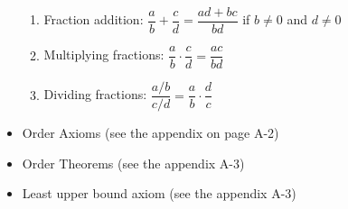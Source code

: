 \documentclass[11pt]{article}
\begin{document}
\begin{itemize}
\begin{enumerate}[label=T\arabic*]
        \item Fraction addition: $\dfrac{a}{b} + \dfrac{c}{d} = \dfrac{ad + bc}{bd}$ if $b\neq 0$ and $d\neq 0$
        \item Multiplying fractions: $\dfrac{a}{b} \cdot \dfrac{c}{d} = \dfrac{ac}{bd}$ 
        \item Dividing fractions: $\dfrac{a/b}{c/d} = \dfrac{a}{b} \cdot \dfrac{d}{c}$
    \end{enumerate}
    \item Order Axioms (see the appendix on page A-2)
    \item Order Theorems (see the appendix A-3)
    \item Least upper bound axiom (see the appendix A-3)
\end{itemize}
\end{document}
